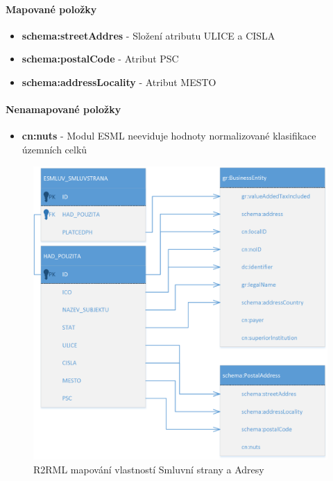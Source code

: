 \paragraph*{Mapované položky}
\begin{itemize}
\item \textbf{schema:streetAddres} - Složení atributu ULICE a CISLA
\item \textbf{schema:postalCode} - Atribut PSC
\item \textbf{schema:addressLocality} - Atribut MESTO
\end{itemize}

\paragraph*{Nenamapované položky}
\begin{itemize}
\item \textbf{cn:nuts} - Modul ESML neeviduje hodnoty normalizované klasifikace územních celků
\end{itemize}

\begin{figure}[H]
\centerline{\includegraphics[width=\textwidth]{img/mapParty.eps}}
\caption{R2RML mapování vlastností Smluvní strany a Adresy}
\label{obr:mapParty}
\end{figure}

